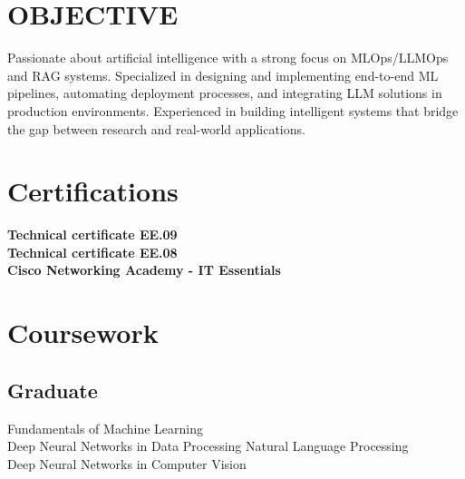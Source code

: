 \documentclass[]{deedy-resume-openfont}
\begin{document}
\begin{minipage}[t]{0.4\textwidth} 


\section{OBJECTIVE}
{Passionate about artificial intelligence with a strong focus on MLOps/LLMOps and RAG systems. Specialized in designing and implementing end-to-end ML pipelines, automating deployment processes, and integrating LLM solutions in production environments. Experienced in building intelligent systems that bridge the gap between research and real-world applications.}


\section{Certifications}
\textbf{Technical certificate EE.09} \\

\textbf{Technical certificate EE.08} \\

\textbf{Cisco Networking Academy - IT Essentials} \\


\section{Coursework}
\subsection{Graduate}
Fundamentals of Machine Learning \\
Deep Neural Networks in Data Processing
Natural Language Processing \\
Deep Neural Networks in Computer Vision


\end{minipage}
\end{document}
